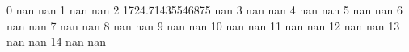0 nan nan
1 nan nan
2 1724.71435546875 nan
3 nan nan
4 nan nan
5 nan nan
6 nan nan
7 nan nan
8 nan nan
9 nan nan
10 nan nan
11 nan nan
12 nan nan
13 nan nan
14 nan nan

